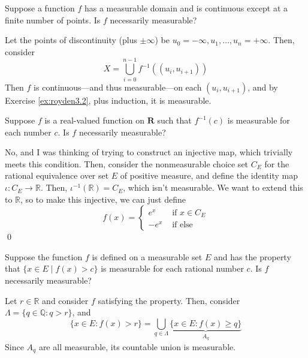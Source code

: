   \begin{exercise}[Royden 3.3]
    Suppose a function $f$ has a measurable domain and is continuous except at a finite number of points. Is $f$ necessarily measurable?
  \end{exercise}
  \begin{solution}
    Let the points of discontinuity (plus $\pm \infty$) be $u_0 = -\infty, u_1, \ldots, u_n = +\infty$. Then, consider 
    \begin{equation}
      X = \bigcup_{i=0}^{n-1} f^{-1} ((u_i, u_{i+1})) 
    \end{equation}
    Then $f$ is continuous---and thus measurable---on each $(u_i, u_{i+1})$, and by Exercise \ref{ex:royden3.2}, plus induction, it is measurable. 
  \end{solution}

  \begin{exercise}[Royden 3.4]
    Suppose $f$ is a real-valued function on $\mathbf{R}$ such that $f^{-1}(c)$ is measurable for each number $c$. Is $f$ necessarily measurable?
  \end{exercise}
  \begin{solution}
    No, and I was thinking of trying to construct an injective map, which trivially meets this condition. Then, consider the nonmeasurable choice set $C_E$ for the rational equivalence over set $E$ of positive measure, and define the identity map $\iota: C_E \to \mathbb{R}$. Then, $\iota^{-1} (\mathbb{R}) = C_E$, which isn't measurable. We want to extend this to $\mathbb{R}$, so to make this injective, we can just define 
    \begin{equation}
      f(x) = \begin{cases} 
        e^x & \text{ if } x \in C_E \\ 
        -e^x & \text{ if else} 
      \end{cases} 
    \end{equation}
    \qed 
  \end{solution}

  \begin{exercise}[Royden 3.5]
    Suppose the function $f$ is defined on a measurable set $E$ and has the property that $\{x \in E \mid f(x) > c\}$ is measurable for each rational number $c$. Is $f$ necessarily measurable?
  \end{exercise}
  \begin{solution}
    Let $r \in \mathbb{R}$ and consider $f$ satisfying the property. Then, consider $\Lambda = \{q \in \mathbb{Q} \colon q > r \}$, and 
    \begin{equation}
      \{x \in E \colon f(x) > r \}  = \bigcup_{q \in \Lambda} \underbrace{\{x \in E \colon f(x) \geq q \}}_{A_q}
    \end{equation}
    Since $A_q$ are all measurable, its countable union is measurable. 
  \end{solution}

